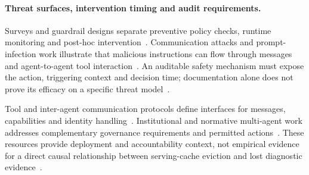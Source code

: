 \paragraph{Threat surfaces, intervention timing and audit requirements.}
Surveys and guardrail designs separate preventive policy checks, runtime monitoring and post-hoc intervention~\cite{ext018,ext019,ext020,ext022}.
Communication attacks and prompt-infection work illustrate that malicious instructions can flow through messages and agent-to-agent tool interaction~\cite{ext033,ext054,ext075}.
An auditable safety mechanism must expose the action, triggering context and decision time; documentation alone does not prove its efficacy on a specific threat model~\cite{ext106,ext107,ext118}.

Tool and inter-agent communication protocols define interfaces for messages, capabilities and identity handling~\cite{ext120,ext123,ext124,ext125}.
Institutional and normative multi-agent work addresses complementary governance requirements and permitted actions~\cite{ext126,ext128,ext142}.
These resources provide deployment and accountability context, not empirical evidence for a direct causal relationship between serving-cache eviction and lost diagnostic evidence~\cite{ext144,ext145,ext146}.

